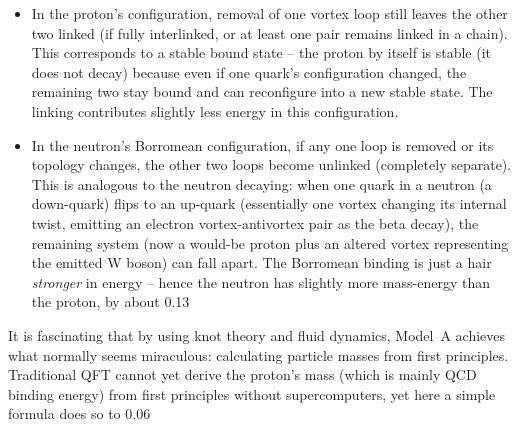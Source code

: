 \begin{itemize}

\item 
In the proton’s configuration, removal of one vortex loop still leaves the other two linked (if fully interlinked, or at least one pair remains linked in a chain). This corresponds to a stable bound state – the proton by itself is stable (it does not decay) because even if one quark’s configuration changed, the remaining two stay bound and can reconfigure into a new stable state. The linking contributes slightly less energy in this configuration.




\item 
In the neutron’s Borromean configuration, if any one loop is removed or its topology changes, the other two loops become unlinked (completely separate). This is analogous to the neutron decaying: when one quark in a neutron (a down-quark) flips to an up-quark (essentially one vortex changing its internal twist, emitting an electron vortex-antivortex pair as the beta decay), the remaining system (now a would-be proton plus an altered vortex representing the emitted W boson) can fall apart. The Borromean binding is just a hair \textit{stronger} in energy – hence the neutron has slightly more mass-energy than the proton, by about 0.13%




\end{itemize}

It is fascinating that by using knot theory and fluid dynamics, Model A achieves what normally seems miraculous: calculating particle masses from first principles. Traditional QFT cannot yet derive the proton’s mass (which is mainly QCD binding energy) from first principles without supercomputers, yet here a simple formula does so to 0.06%


